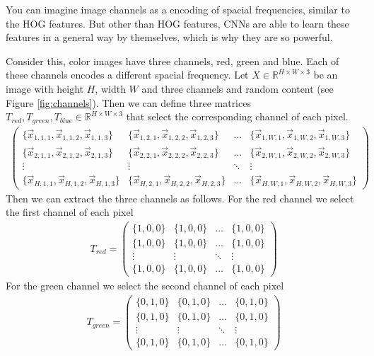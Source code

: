 You can imagine image channels as a encoding of spacial frequencies, similar to the HOG features.
But other than HOG features, CNNs are able to learn these features in a general way by themselves, which is why they are so powerful.

Consider this, color images have three channels, red, green and blue. Each of these channels encodes a different spacial frequency.
Let $X \in \mathbb{R}^{H \times W \times 3}$ be an image with height $H$, width $W$ and three channels and random content (see Figure \ref{fig:channels}).
Then we can define three matrices $T_{red}, T_{green}, T_{blue} \in \mathbb{R}^{H \times W \times 3}$ that select the corresponding channel of each pixel.
\begin{align}
  \begin{pmatrix}
    \{\vec{x}_{1,1,1},\vec{x}_{1,1,2},\vec{x}_{1,1,3}\}
    & \{\vec{x}_{1,2,1},\vec{x}_{1,2,2},\vec{x}_{1,2,3}\}
    & \dots
    & \{\vec{x}_{1,W,1},\vec{x}_{1,W,2},\vec{x}_{1,W,3}\} \\
    \{\vec{x}_{2,1,1},\vec{x}_{2,1,2},\vec{x}_{2,1,3}\}
    & \{\vec{x}_{2,2,1},\vec{x}_{2,2,2},\vec{x}_{2,2,3}\}
    & \dots
    & \{\vec{x}_{2,W,1},\vec{x}_{2,W,2},\vec{x}_{2,W,3}\} \\
    \vdots & \vdots & \ddots & \vdots \\
    \{\vec{x}_{H,1,1},\vec{x}_{H,1,2},\vec{x}_{H,1,3}\}
    & \{\vec{x}_{H,2,1},\vec{x}_{H,2,2},\vec{x}_{H,2,3}\}
    & \dots
    & \{\vec{x}_{H,W,1},\vec{x}_{H,W,2},\vec{x}_{H,W,3}\}
  \end{pmatrix}
\end{align}
Then we can extract the three channels as follows.
For the red channel we select the first channel of each pixel
\begin{align}
  T_{red} = \begin{pmatrix}
    \{1, 0, 0\}
    & \{1, 0, 0\}
    & \dots
    & \{1, 0, 0\}\\
    \{1, 0, 0\}
    & \{1, 0, 0\}
    & \dots
    & \{1, 0, 0\}\\
    \vdots & \vdots & \ddots & \vdots \\
    \{1, 0, 0\}
    & \{1, 0, 0\}
    & \dots
    & \{1, 0, 0\}
  \end{pmatrix}
\end{align}
For the green channel we select the second channel of each pixel
\begin{align}
  T_{green} = \begin{pmatrix}
    \{0, 1, 0\}
    & \{0, 1, 0\}
    & \dots
    & \{0, 1, 0\}\\
    \{0, 1, 0\}
    & \{0, 1, 0\}
    & \dots
    & \{0, 1, 0\}\\
    \vdots & \vdots & \ddots & \vdots \\
    \{0, 1, 0\}
    & \{0, 1, 0\}
    & \dots
    & \{0, 1, 0\}
  \end{pmatrix}
\end{align}
